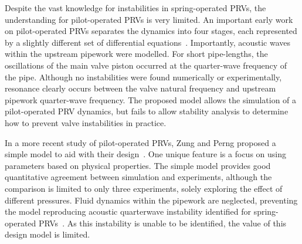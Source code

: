 Despite the vast knowledge for instabilities in spring-operated PRVs, the understanding for pilot-operated PRVs is very limited. An important early work on pilot-operated PRVs separates the dynamics into four stages, each represented by a slightly different set of differential equations~\cite{Botros1997Riser-ReliefInteractions}.
Importantly, acoustic waves within the upstream pipework were modelled.
For short pipe-lengths, the oscillations of the main valve piston occurred at the quarter-wave frequency of the pipe. Although no instabilities were found numerically or experimentally, resonance clearly occurs between the valve natural frequency and upstream pipework quarter-wave frequency. %
The proposed model allows the simulation of a pilot-operated PRV dynamics, but fails to allow stability analysis to determine how to prevent valve instabilities in practice.

In a more recent study of pilot-operated PRVs, Zung and Perng proposed a simple model to aid with their design~\cite{Zung2002NonlinearDesigners}. One unique feature is a focus on using parameters based on physical properties.
The simple model provides good quantitative agreement between simulation and experiments, although the comparison is limited to only three experiments, solely exploring the effect of different pressures. Fluid dynamics within the pipework are neglected, preventing the model reproducing acoustic quarterwave instability identified for spring-operated PRVs~\cite{Hos2017DynamicRecommendations}. As this instability is unable to be identified, the value of this design model is limited.

